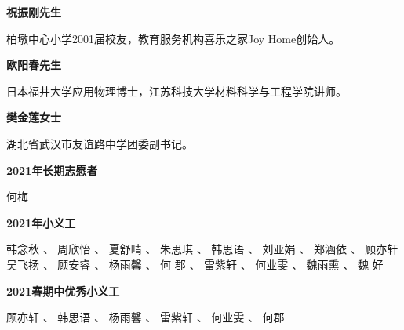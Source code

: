 \textbf{祝振刚先生} 

柏墩中心小学2001届校友，教育服务机构喜乐之家Joy Home创始人。

\textbf{欧阳春先生 }

日本福井大学应用物理博士，江苏科技大学材料科学与工程学院讲师。

\textbf{樊金莲女士}

湖北省武汉市友谊路中学团委副书记。


\vspace{20pt}

\centerline{\textbf{2021年长期志愿者}}

\vspace{10pt}
\centerline{何梅}


\vspace{20pt}
\centerline{\textbf{2021年小义工}}
\vspace{10pt}





\begin{center}
韩念秋	、
周欣怡	、
夏舒晴	、
朱思琪	、
韩思语	、
刘亚娟	、
郑涵依	、
顾亦轩	\\
吴飞扬	、
顾安睿	、
杨雨馨	、
何 \quad 郡	、
雷紫轩	、
何业雯	、
魏雨熏	、
魏 \quad 好  
\end{center}

	

\vspace{20pt}
\centerline{\textbf{2021春期中优秀小义工}}
\vspace{10pt}
\begin{center}
    顾亦轩	、
韩思语	、
杨雨馨	、
雷紫轩	、
何业雯	、
何郡
\end{center}
	




\vspace{10pt}

